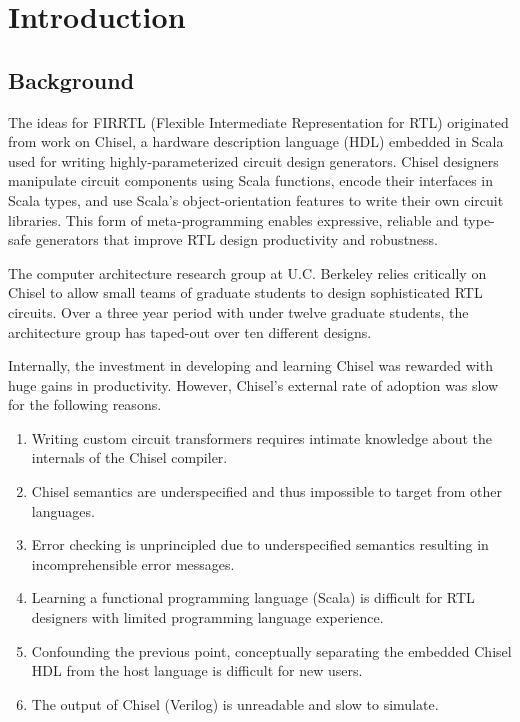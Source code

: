 \documentclass[12pt]{article}
\begin{document}
\maketitle
\tableofcontents
\newpage


\section{Introduction}

\subsection{Background}
The ideas for FIRRTL (Flexible Intermediate Representation for RTL) originated from work on Chisel, a hardware description language (HDL) embedded in Scala used for writing highly-parameterized circuit design generators. Chisel designers manipulate circuit components using Scala functions, encode their interfaces in Scala types, and use Scala's object-orientation features to write their own circuit libraries. This form of meta-programming enables expressive, reliable and type-safe generators that improve RTL design productivity and robustness.

The computer architecture research group at U.C. Berkeley relies critically on Chisel to allow small teams of graduate students to design sophisticated RTL circuits. Over a three year period with under twelve graduate students, the architecture group has taped-out over ten different designs. 

Internally, the investment in developing and learning Chisel was rewarded with huge gains in productivity. However, Chisel's external rate of adoption was slow for the following reasons.
\begin{enumerate}[topsep=3pt,itemsep=-0.5ex,partopsep=1ex,parsep=1ex]
\item Writing custom circuit transformers requires intimate knowledge about the internals of the Chisel compiler.
\item Chisel semantics are underspecified and thus impossible to target from other languages.
\item Error checking is unprincipled due to underspecified semantics resulting in incomprehensible error messages.
\item Learning a functional programming language (Scala) is difficult for RTL designers with limited programming language experience.
\item Confounding the previous point, conceptually separating the embedded Chisel HDL from the host language is difficult for new users.
\item The output of Chisel (Verilog) is unreadable and slow to simulate.
\end{enumerate}
\end{document}

